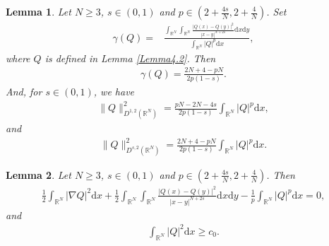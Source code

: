 \documentclass[10pt,a4paper]{amsart}
\newtheorem{lemma}{Lemma}
\begin{document}
\begin{lemma}\label{Lemma5.2}
Let $N\geqslant 3$, $s\in(0,1)$ and $p \in(2+\frac{4s}{N},2+\frac{4}{N})$.
Set
\begin{equation*}
\begin{aligned}
\gamma(Q)
=&\frac{\int_{\mathbb{R}^{N}}\int_{\mathbb{R}^{N}}\frac{|Q(x)-Q(y)|^{2}}{|x-y|^{N+2s}}\mathrm{d}x\mathrm{d}y}
{\int_{\mathbb{R}^{N}}|Q|^{p}\mathrm{d}x},
\end{aligned}
\end{equation*}
where $Q$ is defined in Lemma \ref{Lemma4.2}.
Then
\begin{equation*}
\begin{aligned}
\gamma(Q)=\frac{2N+4-pN}{2p(1-s)}.
\end{aligned}
\end{equation*}
And,
for $s\in(0,1)$, we have
\begin{equation*}
\begin{aligned}
\|Q\|^{2}_{D^{1,2}(\mathbb{R}^{N})}
=\frac{pN-2N-4s}{2p(1-s)}\int_{\mathbb{R}^{N}}|Q|^{p}\mathrm{d}x,
\end{aligned}
\end{equation*}
and
\begin{equation*}
\begin{aligned}
\|Q\|^{2}_{D^{s,2}(\mathbb{R}^{N})}
=\frac{2N+4-pN}{2p(1-s)}
\int_{\mathbb{R}^{N}}|Q|^{p}\mathrm{d}x.
\end{aligned}
\end{equation*}
\end{lemma}

\begin{lemma}\label{Lemma5.3}
Let $N\geqslant 3$, $s\in(0,1)$ and $p \in(2+\frac{4s}{N},2+\frac{4}{N})$.
Then
\begin{equation*}
\begin{aligned}
\frac{1}{2}
\int_{\mathbb{R}^{N}}
|\nabla Q|^{2}
\mathrm{d}x
+\frac{1}{2}
\int_{\mathbb{R}^{N}}
\int_{\mathbb{R}^{N}}
\frac{|Q(x)-Q(y)|^{2}}{|x-y|^{N+2s}}
\mathrm{d}x
\mathrm{d}y
-\frac{1}{p}
\int_{\mathbb{R}^{N}}
|Q|^{p}
\mathrm{d}x=0,
\end{aligned}
\end{equation*}
and
\begin{equation*}
\begin{aligned}
\int_{\mathbb{R}^{N}}
|Q|^{2}
\mathrm{d}x\geqslant c_{0}.
\end{aligned}
\end{equation*}
\end{lemma}
\end{document}

